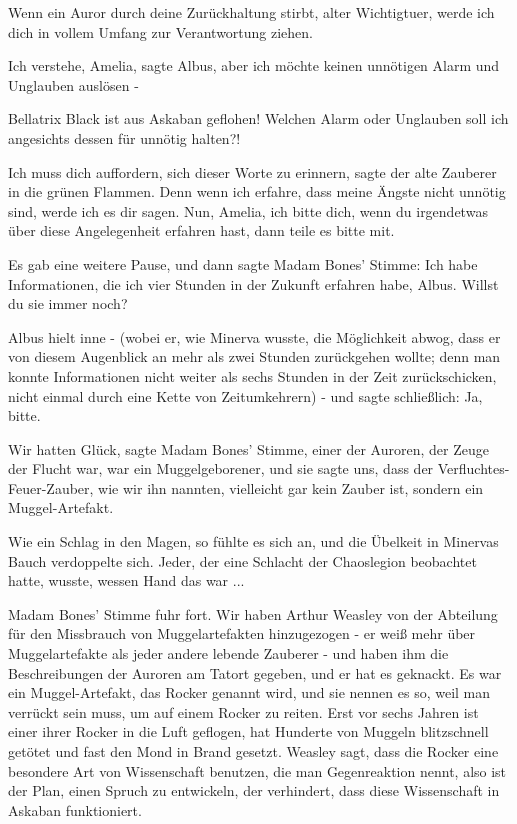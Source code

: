 \glqq{}Wenn ein Auror durch deine Zurückhaltung stirbt, alter Wichtigtuer, werde
ich dich in vollem Umfang zur Verantwortung ziehen.\grqq{}

\glqq{}Ich verstehe, Amelia\grqq{}, sagte Albus, \glqq{}aber ich möchte keinen
unnötigen Alarm und Unglauben auslösen -\grqq{}

\glqq{}Bellatrix Black ist aus Askaban geflohen! Welchen Alarm oder Unglauben
soll ich angesichts dessen für unnötig halten?!\grqq{}

\glqq{}Ich muss dich auffordern, sich dieser Worte zu erinnern\grqq{}, sagte der
alte Zauberer in die grünen Flammen. \glqq{}Denn wenn ich erfahre, dass meine
Ängste nicht unnötig sind, werde ich es dir sagen. Nun, Amelia, ich bitte dich,
wenn du irgendetwas über diese Angelegenheit erfahren hast, dann teile es bitte
mit.\grqq{}

Es gab eine weitere Pause, und dann sagte Madam Bones' Stimme: \glqq{}Ich habe
Informationen, die ich vier Stunden in der Zukunft erfahren habe, Albus. Willst
du sie immer noch?\grqq{}

Albus hielt inne - (wobei er, wie Minerva wusste, die Möglichkeit abwog, dass er
von diesem Augenblick an mehr als zwei Stunden zurückgehen wollte; denn man
konnte Informationen nicht weiter als sechs Stunden in der Zeit zurückschicken,
nicht einmal durch eine Kette von Zeitumkehrern) - und sagte schließlich: \glqq{}
Ja, bitte.\grqq{}

\glqq{}Wir hatten Glück\grqq{}, sagte Madam Bones' Stimme, \glqq{}einer der
Auroren, der Zeuge der Flucht war, war ein Muggelgeborener, und sie sagte uns,
dass der Verfluchtes-Feuer-Zauber, wie wir ihn nannten, vielleicht gar kein
Zauber ist, sondern ein Muggel-Artefakt.\grqq{}

Wie ein Schlag in den Magen, so fühlte es sich an, und die Übelkeit in Minervas
Bauch verdoppelte sich. Jeder, der eine Schlacht der Chaoslegion beobachtet
hatte, wusste, wessen Hand das war ...

Madam Bones' Stimme fuhr fort. \glqq{}Wir haben Arthur Weasley von der Abteilung
für den Missbrauch von Muggelartefakten hinzugezogen - er weiß mehr über
Muggelartefakte als jeder andere lebende Zauberer - und haben ihm die
Beschreibungen der Auroren am Tatort gegeben, und er hat es geknackt. Es war ein
Muggel-Artefakt, das Rocker genannt wird, und sie nennen es so, weil man
verrückt sein muss, um auf einem Rocker zu reiten. Erst vor sechs Jahren ist
einer ihrer Rocker in die Luft geflogen, hat Hunderte von Muggeln blitzschnell
getötet und fast den Mond in Brand gesetzt. Weasley sagt, dass die Rocker eine
besondere Art von Wissenschaft benutzen, die man Gegenreaktion nennt, also ist
der Plan, einen Spruch zu entwickeln, der verhindert, dass diese Wissenschaft in
Askaban funktioniert.\grqq{}

